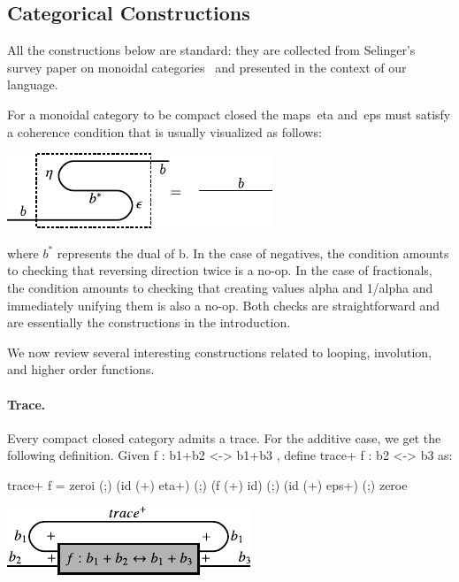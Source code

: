 \documentclass[preprint]{sigplanconf}
\begin{document}
\subsection{Categorical Constructions}

All the constructions below are standard: they are collected from Selinger's
survey paper on monoidal
categories~\cite{springerlink:10.1007/978-3-642-12821-94} and presented in
the context of our language. 

For a monoidal category to be compact closed the maps~{{eta}}
and~{{eps}} must satisfy a coherence condition that is usually
visualized as follows:
\begin{center}
  \includegraphics{diagrams/coherence.pdf}
\end{center}
where $b^*$ represents the dual of {{b}}.  In the case of negatives,
the condition amounts to checking that reversing direction twice is a
no-op. In the case of fractionals, the condition amounts to checking
that creating values {{alpha}} and {{1/alpha}} and immediately
unifying them is also a no-op. Both checks are straightforward and are
essentially the constructions in the introduction.

We now review several interesting constructions related to looping,
involution, and higher order functions. 

\paragraph*{Trace.}
Every compact closed category admits a trace. For the additive case, we get
the following definition.  Given {{f : b1+b2 <-> b1+b3 }}, 
define {{trace+ f : b2 <-> b3}} as:

{{ trace+ f = zeroi (;) (id (+) eta+) (;) (f (+) id) (;) (id (+) eps+) (;) zeroe }} 

\begin{center}
  \includegraphics{diagrams/thesis/trace_plus.pdf}
\end{center}  
\end{document}
